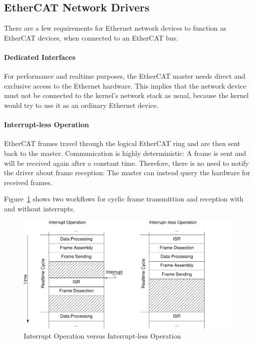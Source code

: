 \documentclass[a4paper,12pt,BCOR6mm,bibtotoc,idxtotoc]{scrbook}
\begin{document}

\subsection{EtherCAT Network Drivers}
\label{sec:requirements}

There are a few requirements for Ethernet network devices to function
as EtherCAT devices, when connected to an EtherCAT bus.

\paragraph{Dedicated Interfaces}

For performance and realtime purposes, the EtherCAT master needs
direct and exclusive access to the Ethernet hardware. This implies
that the network device must not be connected to the kernel's network
stack as usual, because the kernel would try to use it as an ordinary
Ethernet device.

\paragraph{Interrupt-less Operation}

EtherCAT frames travel through the logical EtherCAT ring and are then
sent back to the master. Communication is highly deterministic: A
frame is sent and will be received again after a constant time.
Therefore, there is no need to notify the driver about frame
reception: The master can instead query the hardware for received
frames.

Figure~\ref{fig:interrupt} shows two workflows for cyclic frame
transmittion and reception with and without interrupts.

\begin{figure}[htbp]
  \centering
  \includegraphics[width=.8\textwidth]{images/interrupt}
  \caption{Interrupt Operation versus Interrupt-less Operation}
  \label{fig:interrupt}
\end{figure}
\end{document}
